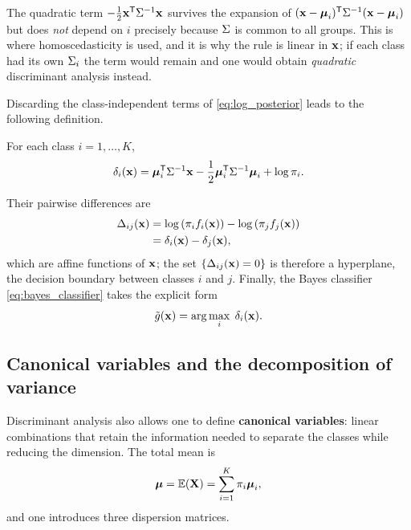 \begin{remark}
  The quadratic term $-\tfrac12\mathbf{x}^{\mathsf{T}}\Sigma^{-1}\mathbf{x}$ survives the expansion
  of $(\mathbf{x}-\boldsymbol{\mu}_i)^{\mathsf{T}}\Sigma^{-1}(\mathbf{x}-\boldsymbol{\mu}_i)$ but does \emph{not} depend on
  $i$ precisely because $\Sigma$ is common to all groups. This is where
  homoscedasticity is used, and it is why the rule is linear in $\mathbf{x}$; if
  each class had its own $\Sigma_i$ the term would remain and one would obtain
  \emph{quadratic} discriminant analysis instead.
\end{remark}

Discarding the class-independent terms of \eqref{eq:log_posterior} leads to the
following definition.

\begin{definition}
  \label{def:linear_discriminant}
  For each class $i=1,\dots,K$,
  \begin{equation}
    \label{eq:delta_i}
    \delta_i(\mathbf{x})=\boldsymbol{\mu}_i^{\mathsf{T}}\Sigma^{-1}\mathbf{x}
      -\frac{1}{2}\boldsymbol{\mu}_i^{\mathsf{T}}\Sigma^{-1}\boldsymbol{\mu}_i+\log\pi_i .
  \end{equation}
\end{definition}

Their pairwise differences are
\begin{equation}
  \label{eq:delta_ij}
  \begin{aligned}
    \Delta_{ij}(\mathbf{x})
      &=\log\left( \pi_i f_i(\mathbf{x}) \right)-\log\left( \pi_j f_j(\mathbf{x}) \right)\\
      &=\delta_i(\mathbf{x})-\delta_j(\mathbf{x}),
  \end{aligned}
\end{equation}
which are affine functions of $\mathbf{x}$; the set $\left\{ \Delta_{ij}(\mathbf{x})=0 \right\}$ is
therefore a hyperplane, the decision boundary between classes $i$ and $j$.
Finally, the Bayes classifier \eqref{eq:bayes_classifier} takes the explicit
form
\begin{equation}
  \label{eq:lda_classifier}
  \tilde{g}(\mathbf{x})=\arg\max_{i}\;\delta_i(\mathbf{x}).
\end{equation}

\subsection{Canonical variables and the decomposition of variance}
\label{subsec:canonical_variables}

Discriminant analysis also allows one to define \textbf{canonical variables}:
linear combinations that retain the information needed to separate the classes
while reducing the dimension. The total mean is
\begin{equation}
  \label{eq:total_mean}
  \boldsymbol{\mu}=\mathbb{E}(\mathbf{X})=\sum_{i=1}^{K}\pi_i\boldsymbol{\mu}_i,
\end{equation}
and one introduces three dispersion matrices.

